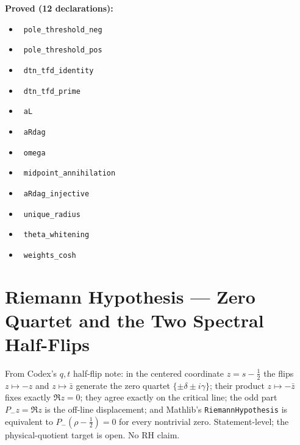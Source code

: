 \documentclass{report}
\theoremstyle{definition}
\begin{document}
\noindent\textbf{Proved (12 declarations):}
\begin{itemize}
  \item {}\leanok\ \texttt{pole\_threshold\_neg}
  \item {}\leanok\ \texttt{pole\_threshold\_pos}
  \item {}\leanok\ \texttt{dtn\_tfd\_identity}
  \item {}\leanok\ \texttt{dtn\_tfd\_prime}
  \item {}\leanok\ \texttt{aL}
  \item {}\leanok\ \texttt{aRdag}
  \item {}\leanok\ \texttt{omega}
  \item {}\leanok\ \texttt{midpoint\_annihilation}
  \item {}\leanok\ \texttt{aRdag\_injective}
  \item {}\leanok\ \texttt{unique\_radius}
  \item {}\leanok\ \texttt{theta\_whitening}
  \item {}\leanok\ \texttt{weights\_cosh}
\end{itemize}

\section{Riemann Hypothesis --- Zero Quartet and the Two Spectral Half-Flips}
From Codex's $q,t$ half-flip note: in the centered coordinate $z=s-\tfrac12$ the flips $z\mapsto-z$ and $z\mapsto\bar z$ generate the zero quartet $\{\pm\delta\pm i\gamma\}$; their product $z\mapsto-\bar z$ fixes exactly $\Re z=0$; they agree exactly on the critical line; the odd part $P_-z=\Re z$ is the off-line displacement; and Mathlib's \texttt{RiemannHypothesis} is equivalent to $P_-(\rho-\tfrac12)=0$ for every nontrivial zero. Statement-level; the physical-quotient target is open. No RH claim.
\end{document}
